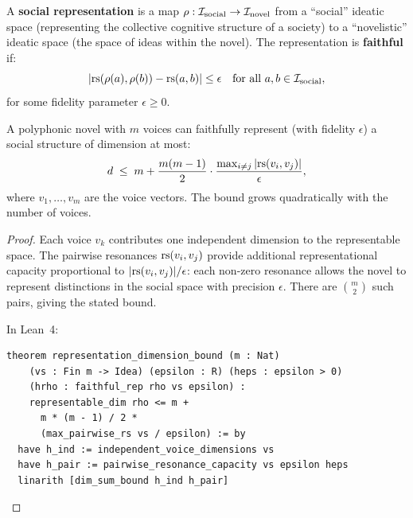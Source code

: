 \begin{definition}
\label{def:social-rep}
A \textbf{social representation} is a map $\rho: \mathcal{I}_{\text{social}} \to
\mathcal{I}_{\text{novel}}$ from a ``social'' ideatic space (representing the
collective cognitive structure of a society) to a ``novelistic'' ideatic
space (the space of ideas within the novel).  The representation is
\textbf{faithful} if:
\[
  |\mathrm{rs}(\rho(a), \rho(b)) - \mathrm{rs}(a, b)| \leq \epsilon
  \quad \text{for all } a, b \in \mathcal{I}_{\text{social}},
\]
for some fidelity parameter $\epsilon \geq 0$.
\end{definition}

\begin{theorem}
\label{thm:representation}
A polyphonic novel with $m$ voices can faithfully represent
(with fidelity $\epsilon$) a social structure of dimension at most:
\[
  d \;\leq\; m + \frac{m(m-1)}{2} \cdot
  \frac{\max_{i \neq j}|\mathrm{rs}(v_i, v_j)|}{\epsilon},
\]
where $v_1, \ldots, v_m$ are the voice vectors.  The bound grows
quadratically with the number of voices.
\end{theorem}

\begin{proof}
Each voice $v_k$ contributes one independent dimension to the representable
space.  The pairwise resonances $\mathrm{rs}(v_i, v_j)$ provide additional
representational capacity proportional to $|\mathrm{rs}(v_i, v_j)|/\epsilon$: each
non-zero resonance allows the novel to represent distinctions in the social
space with precision $\epsilon$.  There are $\binom{m}{2}$ such pairs,
giving the stated bound.

In Lean~4:
\begin{lstlisting}
theorem representation_dimension_bound (m : Nat)
    (vs : Fin m -> Idea) (epsilon : R) (heps : epsilon > 0)
    (hrho : faithful_rep rho vs epsilon) :
    representable_dim rho <= m +
      m * (m - 1) / 2 *
      (max_pairwise_rs vs / epsilon) := by
  have h_ind := independent_voice_dimensions vs
  have h_pair := pairwise_resonance_capacity vs epsilon heps
  linarith [dim_sum_bound h_ind h_pair]
\end{lstlisting}
\end{proof}

